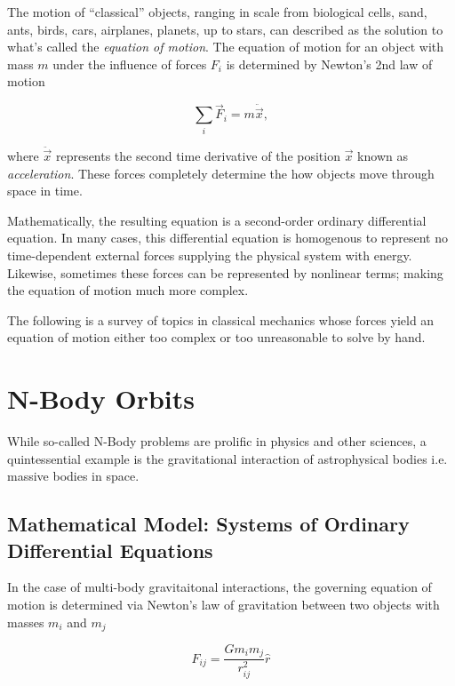 \documentclass{report}
\begin{document}
    The motion of ``classical'' objects, ranging in scale from biological cells, sand, ants, birds, cars, airplanes, planets, up to stars, can described as the solution to what's called the \emph{equation of motion}.  The equation of motion for an object with mass $m$ under the influence of forces $F_i$ is determined by Newton's 2nd law of motion
    
    \begin{equation} \label{eq:newton}
        \sum_i \vec{F}_i = m \ddot{\vec{x}},
    \end{equation}

    where $\ddot{\vec{x}}$ represents the second time derivative of the position $\vec{x}$ known as \emph{acceleration}.  These forces completely determine the how objects move through space in time.
    
    Mathematically, the resulting equation is a second-order ordinary differential equation.  In many cases, this differential equation is homogenous to represent no time-dependent external forces supplying the physical system with energy.  Likewise, sometimes these forces can be represented by nonlinear terms; making the equation of motion much more complex.
    
    The following is a survey of topics in classical mechanics whose forces yield an equation of motion either too complex or too unreasonable to solve by hand.

\pagebreak

    \section{N-Body Orbits} \label{subsec:orbits}

        While so-called N-Body problems are prolific in physics and other sciences, a quintessential example is the gravitational interaction of astrophysical bodies i.e. massive bodies in space.

        \subsection{Mathematical Model: Systems of Ordinary Differential Equations}

            In the case of multi-body gravitaitonal interactions, the governing equation of motion is determined via Newton's law of gravitation between two objects with masses $m_i$ and $m_j$

            \begin{equation}
                F_{ij} = \frac{G m_i m_j}{r_{ij}^2} \hat{r}
            \end{equation}
\end{document}
